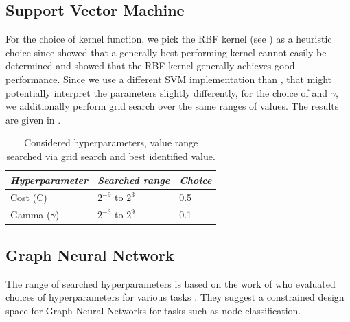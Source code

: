 \documentclass[
	fontsize=10pt, %
	twoside=false, %
	secnumdepth=1, %
]{kaobook}
\begin{document}
\subsection{Support Vector Machine}

For the choice of kernel function, we pick the RBF kernel (see
) as a heuristic choice since
\citeauthor{nielsen_MachineLearningSupport_2019} showed that a generally
best-performing kernel cannot easily be determined and showed that the RBF
kernel generally achieves good performance.
%
Since we use a different SVM implementation than \nielsen, that might
potentially interpret the parameters slightly differently, for the choice of
 and $\gamma$, we additionally perform grid search over the same ranges
of values.
%
The results are given in
.

\begin{table}[h]
  \begin{tabular}[h]{| l | l | l |}
    \textit{Hyperparameter} & \textit{Searched range} & \textit{Choice} \\
    \hline
    Cost (C) & $2^{-9}$ to $2^3$ & 0.5 \\
    Gamma ($\gamma$) & $2^{-3}$ to $2^{9}$ & 0.1
  \end{tabular}
  \caption{Considered hyperparameters, value range searched via grid search and
    best identified value.}
  \label{tab:svm-hyperparams}
\end{table}



\subsection{Graph Neural Network}

The range of searched hyperparameters is based on the work of
\citeauthor{you_design_2020} who evaluated choices of hyperparameters for
various tasks \cite{you_design_2020}. They suggest a constrained design space
for Graph Neural Networks for tasks such as node classification.  
\end{document}
